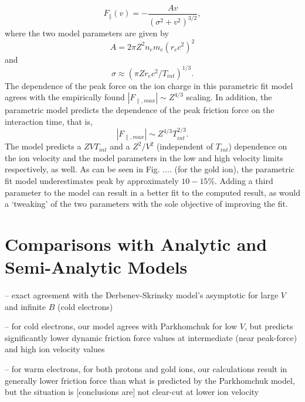 \documentclass[12pt, reqno]{amsart}
\begin{document}
\begin{equation}
F_{\parallel}(v) = - \frac{A v}{(\sigma^2 + v^2)^{3/2}} ,
\end{equation}
where the two model parameters are given by 
\begin{equation*}
A = 2 \pi Z^2 n_e m_e (r_e c^2)^2 
\end{equation*}
and
\begin{equation*}
\sigma \approx (\pi Z r_e c^2 / T_{int})^{1/3} .
\end{equation*}
The dependence of the peak force on the ion charge in this parametric fit model agrees with the empirically found $|F_{\parallel,max}| \sim Z^{4/3}$ scaling. In addition, the parametric model predicts the dependence of the peak friction force on the interaction time, that is,
\begin{equation}
|F_{\parallel,max}| \sim Z^{4/3} T_{int}^{2/3}.
\end{equation}
The model predicts a $Z V T_{int}$ and a $Z^2 / V^2$ (independent of $T_{int}$) dependence on the ion velocity and the model parameters in the low and high velocity limits respectively, as well.  As can be seen in Fig. .... (for the gold ion), the parametric fit model underestimates peak by approximately $10-15\%$.  Adding a third parameter to the model can result in a better fit to the computed result, as would a `tweaking' of the two parameters with the sole objective of improving the fit.



\section{Comparisons with Analytic and Semi-Analytic Models}

-- exact agreement with the Derbenev-Skrinsky model's asymptotic for large $V$ and infinite $B$ (cold electrons) 

-- for cold electrons, our model agrees with Parkhomchuk for low $V$, but predicts significantly lower dynamic friction force values at intermediate (near peak-force) and high ion velocity values 

 -- for warm electrons,  for both protons and gold ions, our calculations result in generally lower friction force than what is predicted by the Parkhomchuk model, but the situation is [conclusions are] not clear-cut at lower ion velocity 
 
\end{document}
